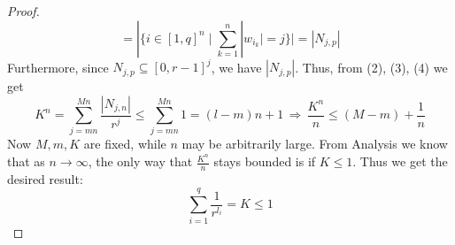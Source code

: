 \documentclass[12pt]{article}
\newenvironment{statement3}[3]{\begin{trivlist}
\item[\hskip \labelsep {\bfseries #1}\hskip \labelsep {\bfseries #2} {#3}\textbf{.}]}{\end{trivlist}}
\begin{document}
\begin{statement3}{(1.7)}{Theorem}{(McMillan's Inequality)}
\begin{proof}
\begin{equation}
            = |\{i \in [1,q]^n \mid \sum_{k=1}^{n} |w_{i_k}| = j\}| \tag{4}
            = |N_{j,p}|
        \end{equation}
        Furthermore, since $N_{j,p} \subseteq [0,r-1]^j$, we have $|N_{j,p}|$. Thus, from (2), (3), (4) we get
        $$
            K^n = \sum_{j = mn}^{Mn} \frac{|N_{j,n}|}{r^j} \leq \sum_{j = mn}^{Mn} 1 = (l-m)n + 1
            \,\Longrightarrow\, \frac{K^n}{n} \leq (M-m) + \frac{1}{n}
        $$
        Now $M,m,K$ are fixed, while $n$ may be arbitrarily large. From Analysis we know
        that as $n \to \infty$, the only way that $\frac{K^n}{n}$ stays bounded is if $K \leq 1$.
        Thus we get the desired result:
        $$
            \sum_{i=1}^{q} \frac{1}{r^{l_i}} = K \leq 1
        $$
    \end{proof}
\end{statement3}

\newpage
{}

\end{document}
